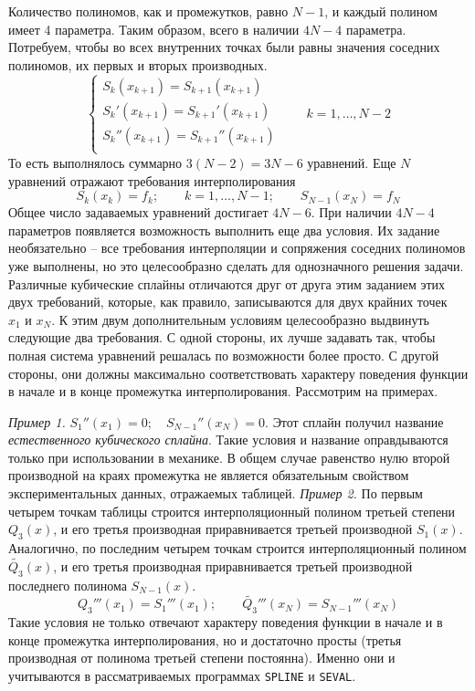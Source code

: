 Количество полиномов, как и промежутков, равно $N - 1$, и каждый полином имеет 4 параметра. Таким образом, всего в
наличии $4N - 4$ параметра. Потребуем, чтобы во всех внутренних точках были равны значения соседних полиномов, их первых
и вторых производных.
\begin{equation*}
    \begin{cases}
        \displaystyle S_k(x_{k+1}) = S_{k+1}(x_{k+1})\\
        S_k'(x_{k+1}) = S_{k+1}'(x_{k+1})\\
        S_k''(x_{k+1}) = S_{k+1}''(x_{k+1})\\
    \end{cases}
    \qquad k = 1,\dots,N-2
\end{equation*}
То есть выполнялось суммарно $3(N-2) = 3N - 6$ уравнений. Еще $N$ уравнений отражают требования интерполирования
\begin{equation*}
    \displaystyle S_k(x_k) = f_k; \qquad k = 1, \dots, N-1; \qquad S_{N-1}(x_N) = f_N
\end{equation*}
Общее число задаваемых уравнений достигает $4N - 6$. При наличии $4N - 4$ параметров появляется возможность выполнить еще
два условия. Их задание необязательно -- все требования интерполяции и сопряжения соседних полиномов уже выполнены, но это
целесообразно сделать для однозначного решения задачи. Различные кубические сплайны отличаются друг от друга этим
заданием этих двух требований, которые, как правило, записываются для двух крайних точек $x_1 \text{ и } x_N$. К этим
двум дополнительным условиям целесообразно выдвинуть следующие два требования. С одной стороны, их лучше задавать так,
чтобы полная система уравнений решалась по возможности более просто. С другой стороны, они должны максимально
соответствовать характеру поведения функции в начале и в конце промежутка интерполирования. Рассмотрим на примерах.
\vspace{10pt}

\emph{Пример 1.} $\displaystyle S_1''(x_1) = 0; \quad S_{N-1}''(x_N) = 0$. Этот сплайн получил название
\emph{естественного кубического сплайна}. Такие условия и название оправдываются только при использовании в механике.
В общем случае равенство нулю второй производной на краях промежутка не является обязательным свойством
экспериментальных данных, отражаемых таблицей.
\emph{Пример 2.} По первым четырем точкам таблицы строится интерполяционный полином третьей степени $Q_3(x)$, и его
третья производная приравнивается третьей производной $S_1(x)$. Аналогично, по последним четырем точкам строится
интерполяционный полином $\tilde{Q_3}(x)$, и его третья производная приравнивается третьей производной последнего
полинома $S_{N-1}(x)$.
\begin{equation*}
    \displaystyle Q_3'''(x_1) = S_1'''(x_1); \qquad \tilde{Q_3}'''(x_N) = S_{N-1}'''(x_N)
\end{equation*}
Такие условия не только отвечают характеру поведения функции в начале и в конце промежутка интерполирования, но и
достаточно просты (третья производная от полинома третьей степени постоянна). Именно они и учитываются в рассматриваемых
программах \verb|SPLINE| и \verb|SEVAL|.

